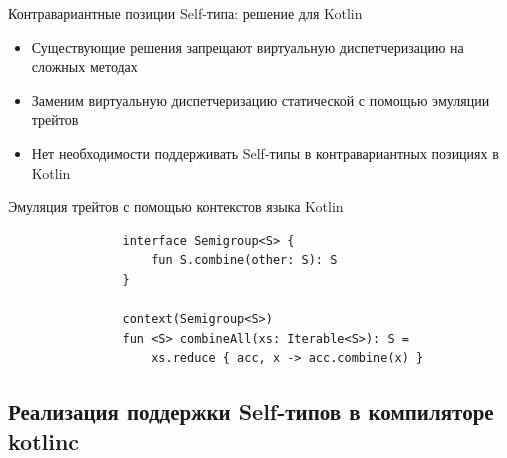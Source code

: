 \documentclass[usenames, dvipsnames]{beamer}
\begin{document}
    \begin{frame}[fragile]{Контравариантные позиции Self-типа: решение для Kotlin}
        \begin{itemize}
            \item Существующие решения запрещают виртуальную диспетчеризацию на сложных методах
            \item Заменим виртуальную диспетчеризацию статической с помощью эмуляции трейтов
            \item Нет необходимости поддерживать Self-типы в контравариантных позициях в Kotlin
        \end{itemize}

        \begin{block}{Эмуляция трейтов с помощью контекстов языка Kotlin}
            \begin{verbatim}
                interface Semigroup<S> {
                    fun S.combine(other: S): S
                }

                context(Semigroup<S>)
                fun <S> combineAll(xs: Iterable<S>): S =
                    xs.reduce { acc, x -> acc.combine(x) }
            \end{verbatim}
        \end{block}
    \end{frame}


    \subsection{Реализация поддержки Self-типов в компиляторе kotlinc}
\end{document}
